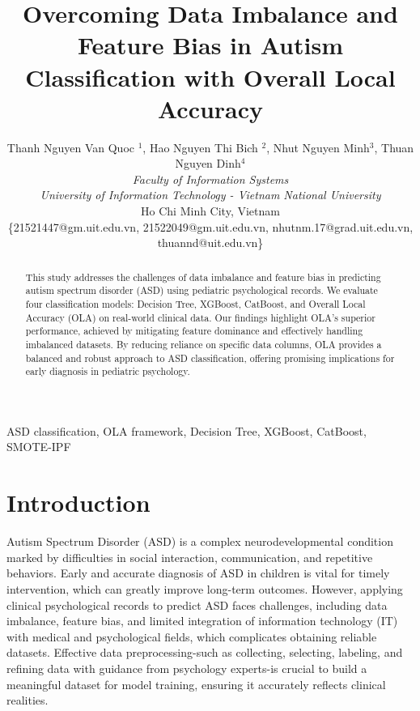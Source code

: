 \documentclass[conference]{IEEEtran}
\begin{document}
\title{Overcoming Data Imbalance and Feature Bias in Autism Classification with Overall Local Accuracy}

\author{
Thanh Nguyen Van Quoc $^{1}$, Hao Nguyen Thi Bich $^{2}$, Nhut Nguyen Minh$^{3}$, Thuan Nguyen Dinh$^{4}$\\
\textit{Faculty of Information Systems} \\
\textit{University of Information Technology - Vietnam National University} \\
Ho Chi Minh City, Vietnam \\
\{21521447@gm.uit.edu.vn, 21522049@gm.uit.edu.vn, nhutnm.17@grad.uit.edu.vn, thuannd@uit.edu.vn\}
}


\maketitle
\IEEEpeerreviewmaketitle

\begin{abstract}
This study addresses the challenges of data imbalance and feature bias in predicting autism spectrum disorder (ASD) using pediatric psychological records. We evaluate four classification models: Decision Tree, XGBoost, CatBoost, and Overall Local Accuracy (OLA) on real-world clinical data. Our findings highlight OLA's superior performance, achieved by mitigating feature dominance and effectively handling imbalanced datasets. By reducing reliance on specific data columns, OLA provides a balanced and robust approach to ASD classification, offering promising implications for early diagnosis in pediatric psychology.
\end{abstract}

\begin{IEEEkeywords}
ASD classification, OLA framework, Decision Tree, XGBoost, CatBoost, SMOTE-IPF
\end{IEEEkeywords}

\section{Introduction}
\lipsum[1]
Autism Spectrum Disorder (ASD) is a complex neurodevelopmental condition marked by difficulties in social interaction, communication, and repetitive behaviors. Early and accurate diagnosis of ASD in children is vital for timely intervention, which can greatly improve long-term outcomes. However, applying clinical psychological records to predict ASD faces challenges, including data imbalance, feature bias, and limited integration of information technology (IT) with medical and psychological fields, which complicates obtaining reliable datasets. Effective data preprocessing-such as collecting, selecting, labeling, and refining data with guidance from psychology experts-is crucial to build a meaningful dataset for model training, ensuring it accurately reflects clinical realities.
\end{document}
